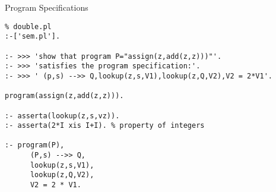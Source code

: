 \documentclass{beamer}
\begin{document}
\begin{frame}[fragile]{Program Specifications}

{\scriptsize
\begin{verbatim}
% double.pl
:-['sem.pl'].

:- >>> 'show that program P="assign(z,add(z,z)))"'.
:- >>> 'satisfies the program specification:'.
:- >>> ' (p,s) -->> Q,lookup(z,s,V1),lookup(z,Q,V2),V2 = 2*V1'.

program(assign(z,add(z,z))).

:- asserta(lookup(z,s,vz)).                                                                        
:- asserta(2*I xis I+I). % property of integers                                               
                                                                                                   
:- program(P),
      (P,s) -->> Q,
      lookup(z,s,V1),                                                                              
      lookup(z,Q,V2),
      V2 = 2 * V1.
\end{verbatim}
}
\end{frame}
\end{document}
